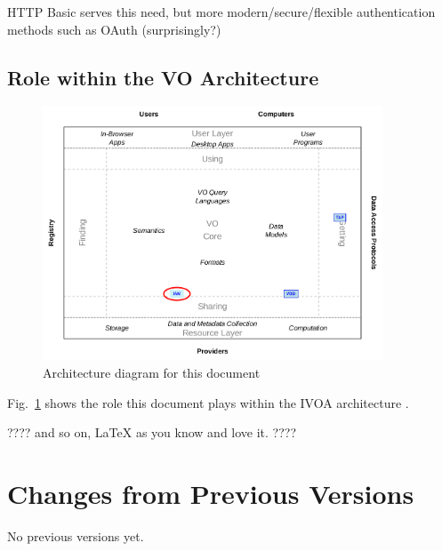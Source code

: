 \documentclass[11pt,a4paper]{ivoa}
\begin{document}
HTTP Basic serves this need, but more modern/secure/flexible authentication
methods such as OAuth (surprisingly?) 

\subsection{Role within the VO Architecture}

\begin{figure}
\centering


\includegraphics[width=0.9\textwidth]{role_diagram.pdf}
\caption{Architecture diagram for this document}
\label{fig:archdiag}
\end{figure}

Fig.~\ref{fig:archdiag} shows the role this document plays within the
IVOA architecture \citep{2021ivoa.spec.1101D}.

???? and so on, LaTeX as you know and love it. ????

\appendix
\section{Changes from Previous Versions}

No previous versions yet.



\end{document}
